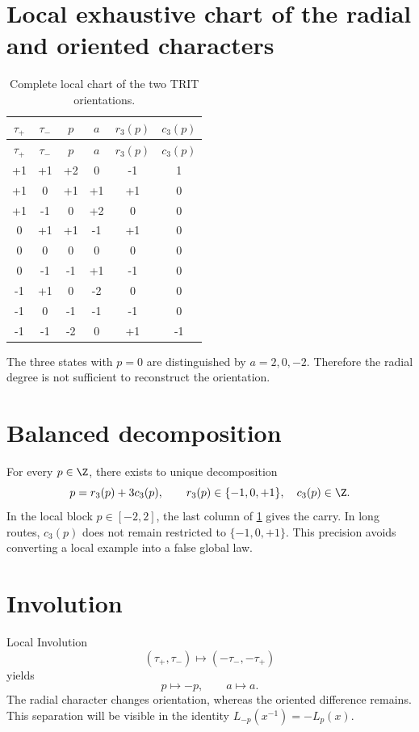\section{Local exhaustive chart of the radial and oriented characters}

\begin{longtable}{cccccc}
\caption{Complete local chart of the two TRIT orientations.}
\label{espiral:tab:doble-trit}\\
\toprule
\(\tau_+\)&\(\tau_-\)&\(p\)&\(a\)&\(r_3(p)\)&\(c_3(p)\)\\
\midrule
\endfirsthead
\toprule
\(\tau_+\)&\(\tau_-\)&\(p\)&\(a\)&\(r_3(p)\)&\(c_3(p)\)\\
\midrule
\endhead
+1&+1&+2&0&-1&1\\
+1&0&+1&+1&+1&0\\
+1&-1&0&+2&0&0\\
0&+1&+1&-1&+1&0\\
0&0&0&0&0&0\\
0&-1&-1&+1&-1&0\\
-1&+1&0&-2&0&0\\
-1&0&-1&-1&-1&0\\
-1&-1&-2&0&+1&-1\\
\bottomrule
\end{longtable}

The three states with \(p=0\) are distinguished by
\(a=2,0,-2\). Therefore the radial degree is not sufficient to
reconstruct the orientation.

\section{Balanced decomposition}

For every \(p\in\Z\), there exists to unique decomposition
\[
 p=r_3(p)+3c_3(p),
 \qquad r_3(p)\in\{-1,0,+1\},\quad c_3(p)\in\Z.
\]
In the local block \(p\in[-2,2]\), the last column of
\cref{espiral:tab:doble-trit} gives the carry. In long routes, \(c_3(p)\) does not remain
restricted to \(\{-1,0,+1\}\). This precision avoids converting a local
example into a false global law.

\section{Involution}

Local Involution
\[
 (\tau_+,\tau_-)\longmapsto(-\tau_-,-\tau_+)
\]
yields
\[
 p\longmapsto-p,
 \qquad
 a\longmapsto a.
\]
The radial character changes orientation, whereas the oriented difference
remains. This separation will be visible in the identity
\(L_{-p}(x^{-1})=-L_p(x)\).

